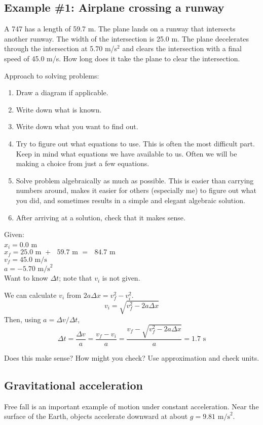 \subsection{Example \#1: Airplane crossing a runway}
A 747 has a length of 59.7 m. The plane lands on a runway that intersects another runway. The width of the intersection is 25.0 m. The plane decelerates through the intersection at 5.70 m/s$^2$ and clears the intersection with a final speed of 45.0 m/s. How long does it take the plane to clear the intersection.

Approach to solving problems:
\begin{enumerate}
\item Draw a diagram if applicable.
\item Write down what is known.
\item Write down what you want to find out.
\item Try to figure out what equations to use. This is often the most difficult part. Keep in mind what equations we have available to us. Often we will be making a choice from just a few equations. 
\item Solve problem algebraically as much as possible. This is easier than carrying numbers around, makes it easier for others (especially me) to figure out what you did, and sometimes results in a simple and elegant algebraic solution.
\item After arriving at a solution, check that it makes sense.
\end{enumerate}

Given:\\
$x_i=0.0$ m\\
$x_f=25.0\mbox{ m }+\mbox{ }59.7\mbox{ m }=\mbox{ }84.7\mbox{ m}$\\
$v_f=45.0\mbox{ m/s}$\\
$a=-5.70\mbox{ m/s}^2$\\

Want to know $\Delta{t}$; note that $v_i$ is not given.

We can calculate $v_i$ from $2a\Delta{x}=v_f^2-v_i^2$.
$$v_i=\sqrt{v_f^2-2a\Delta{x}}$$
Then, using $a=\Delta{v}/\Delta{t}$,
$$\Delta{t}=\frac{\Delta{v}}{a}=\frac{v_f-v_i}{a}=\frac{v_f-\sqrt{v_f^2-2a\Delta{x}}}{a}=1.7\mbox{ s}$$

Does this make sense? How might you check? Use approximation and check units.


\subsection{Gravitational acceleration}
Free fall is an important example of motion under constant acceleration. Near the surface of the Earth, objects accelerate downward at about $g=9.81\mbox{ m/s}^2$.

